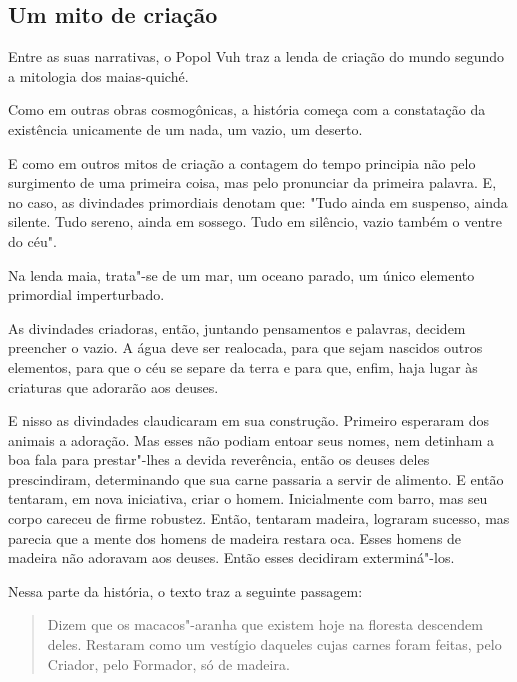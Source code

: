 \documentclass[12pt]{extarticle}
\begin{document}
\subsection{Um mito de criação}

Entre as suas narrativas, o Popol Vuh traz a lenda de criação do mundo
segundo a mitologia dos maias-quiché.

Como em outras obras cosmogônicas, a história começa com a constatação
da existência unicamente de um nada, um vazio, um deserto.

E como em outros mitos de criação a contagem do tempo principia não pelo
surgimento de uma primeira coisa, mas pelo pronunciar da primeira
palavra. E, no caso, as divindades primordiais denotam que: "Tudo ainda
em suspenso, ainda silente. Tudo sereno, ainda em sossego. Tudo em
silêncio, vazio também o ventre do céu".






Na lenda maia, trata"-se de um mar, um oceano parado, um único elemento
primordial imperturbado.

As divindades criadoras, então, juntando pensamentos e palavras, decidem
preencher o vazio. A água deve ser realocada, para que sejam nascidos
outros elementos, para que o céu se separe da terra e para que, enfim,
haja lugar às criaturas que adorarão aos deuses.

E nisso as divindades claudicaram em sua construção. Primeiro esperaram
dos animais a adoração. Mas esses não podiam entoar seus nomes, nem
detinham a boa fala para prestar"-lhes a devida reverência, então os
deuses deles prescindiram, determinando que sua carne passaria a servir
de alimento. E então tentaram, em nova iniciativa, criar o homem.
Inicialmente com barro, mas seu corpo careceu de firme robustez. Então,
tentaram madeira, lograram sucesso, mas parecia que a mente dos homens
de madeira restara oca. Esses homens de madeira não adoravam aos deuses.
Então esses decidiram exterminá"-los.

Nessa parte da história, o texto traz a seguinte passagem:

\begin{quote}
Dizem que os macacos"-aranha que existem hoje na floresta descendem
deles. Restaram como um vestígio daqueles cujas carnes foram feitas,
pelo Criador, pelo Formador, só de madeira.
\end{quote}
\end{document}
